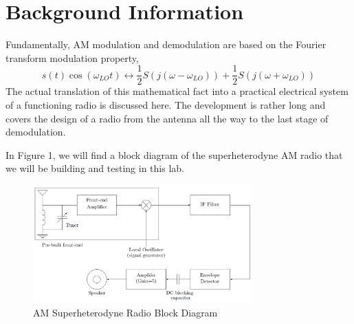 \documentclass [utf8] {article}
\begin{document}
\section{Background Information}
Fundamentally, AM modulation and demodulation are based on the Fourier transform modulation property, $$ s(t)\cos(\omega_{LO}t)\leftrightarrow \frac{1}{2}S(j(\omega-\omega_{LO}))+\frac{1}{2}S(j(\omega+\omega_{LO})) $$
The actual translation of this mathematical fact into a practical electrical system of a functioning radio is discussed here. The development is rather long and covers the design of a radio from the antenna all the way to the last stage of demodulation.

In Figure 1, we will find a block diagram of the superheterodyne AM radio that we will be building and testing in this lab.

\begin{figure}[H]
	\begin{small}
		\begin{center}
			\includegraphics[width=0.75\textwidth]{figures/Figure1.png}
		\end{center}
		\caption{AM Superheterodyne Radio Block Diagram}
		\label{fig:fig1}
	\end{small}
\end{figure}
\end{document}

